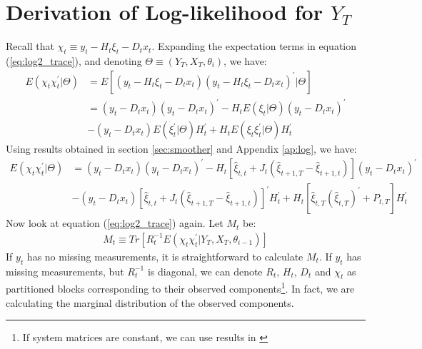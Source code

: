 \documentclass[12pt]{article}
\numberwithin{equation}{section}
\begin{document}
\section{Derivation of Log-likelihood for $Y_T$} \label{ap:log2}
Recall that $\chi_t \equiv y_t - H_t\xi_t - D_tx_t$. Expanding the expectation terms in equation (\ref{eq:log2_trace}), and denoting $\Theta \equiv (Y_T,X_T,\theta_i)$, we have:
\begin{align*}
    E(\chi_t\chi_t^{'}|\Theta) &= E[(y_t - H_t\xi_t - D_tx_t)(y_t - H_t\xi_t - D_tx_t)^{'}|\Theta] \\
    &= (y_t-D_tx_t)(y_t-D_tx_t)^{'} - H_tE(\xi_t|\Theta)(y_t-D_tx_t)^{'} \\
    &-(y_t-D_tx_t)E(\xi_t^{'}|\Theta)H_t^{'} + H_tE(\xi_t\xi_t^{'}|\Theta)H_t^{'}
\end{align*}
Using results obtained in section \ref{sec:smoother} and Appendix \ref{ap:log}, we have:
\begin{align*}
    E(\chi_t\chi_t^{'}|\Theta) &= (y_t-D_tx_t)(y_t-D_tx_t)^{'} - H_t[\hat{\xi}_{t,t}+J_t(\hat{\xi}_{t+1,T}-\hat{\xi}_{t+1,t})](y_t-D_tx_t)^{'} \\
    &-(y_t-D_tx_t)[\hat{\xi}_{t,t}+J_t(\hat{\xi}_{t+1,T}-\hat{\xi}_{t+1,t})]^{'}H_t^{'} + H_t[\hat{\xi}_{t,T}(\hat{\xi}_{t,T})^{'} + P_{t,T}]H_t^{'}
\end{align*}
Now look at equation (\ref{eq:log2_trace}) again. Let $M_t$ be:
\begin{align}
    M_t \equiv Tr[R_t^{-1}E(\chi_t\chi_t^{'}|Y_T,X_T,\theta_{i-1})] \label{eq:trace}
\end{align}
If $y_t$ has no missing measurements, it is straightforward to calculate $M_t$. If $y_t$ has missing measurements, but $R_t^{-1}$ is diagonal, we can denote $R_t$, $H_t$, $D_t$ and $\chi_t$ as partitioned blocks corresponding to their observed components\footnote{If system matrices are constant, we can use results in \cite{shumway_stoffer_1982}}. In fact, we are calculating the marginal distribution of the observed components. 
\end{document}
